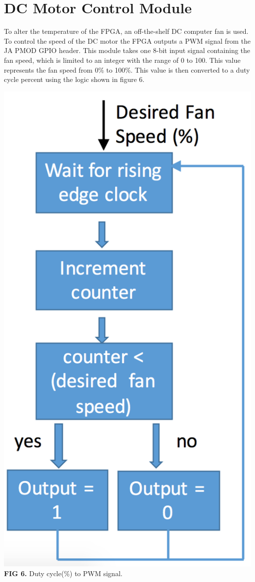\documentclass{article}
\begin{document}
\section{DC Motor Control Module}
To alter the temperature of the FPGA, an off-the-shelf DC computer fan is used. To control the speed of the DC motor the FPGA outputs a PWM signal from the JA PMOD GPIO header. This module takes one 8-bit input signal containing the fan speed, which is limited to an integer with the range of 0 to 100. This value represents the fan speed from 0\% to 100\%. This value is then converted to a duty cycle percent using the logic shown in figure 6.
\begin{center}
\includegraphics[scale=.4]{images/dutyPWM}\\
\textbf{FIG 6.} Duty cycle(\%) to PWM signal.\\
\end{center}
\end{document}
